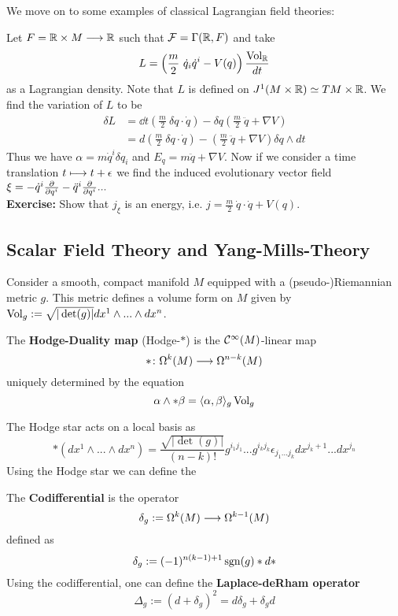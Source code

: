 We move on to some examples of classical Lagrangian field theories:

\begin{example}
  Let $F= \mathbb{R} \times M \longrightarrow \mathbb{R}$ such that ${\mathcal{F}} = \Gamma(\mathbb{R}, F)$ and take
  $$L = \left(\frac{m}{2} \ \dot q_i \dot q^i - V(q) \right)\frac{\operatorname{Vol}_{\mathbb{R}}}{dt}$$
  as a Lagrangian density. Note that $L$ is defined on $J^1(M \times \mathbb{R}) \simeq TM \times \mathbb{R}$. We find the variation of $L$ to be
  \begin{align*}
    \delta L &= \dd{}{t} \left( \frac{m}{2} \ \delta q \cdot \dot q \right) - \delta q \left( \frac{m}{2} \ \ddot q + \nabla V \right)\\
    &= d \left( \frac{m}{2} \ \delta q \cdot \dot q \right) - \left( \frac{m}{2} \ \ddot q + \nabla V \right) \delta q \wedge dt
  \end{align*}
  Thus we have $\alpha = m \dot q^i \delta q_i$ and $E_q = m \ddot q + \nabla V$. Now if we consider a time translation $t \lmap t + \epsilon$ we find the induced evolutionary vector field $\xi = - \dot q^i \frac{\partial }{\partial q^i} - \ddot q^i \frac{\partial }{\partial q^i} ...$\\
  \textbf{Exercise:} Show that $j_\xi$ is an energy, i.e. $j = \frac{m}{2} \ \dot q \cdot \dot q + V(q)$.
\end{example}

\newpage
\subsection{Scalar Field Theory and Yang-Mills-Theory}

Consider a smooth, compact manifold $M$ equipped with a (pseudo-)Riemannian metric $g$. This metric defines a volume form on $M$ given by $\operatorname{Vol}_g := \sqrt{|\det(g)|} dx^1 \wedge ... \wedge dx^n$.

\begin{definition}
  The \textbf{Hodge-Duality map} (Hodge-$*$) is the $\mathcal{C}^{\infty}(M)$-linear map
  $$ * \colon \Omega^k(M) \longrightarrow \Omega^{n-k}(M) $$
  uniquely determined by the equation
  $$ \alpha \wedge * \beta = \langle \alpha, \beta \rangle_g \operatorname{Vol}_g $$
\end{definition}

The Hodge star acts on a local basis as
$$ *(dx^1\wedge ... \wedge dx^n) = \frac{\sqrt{|\det(g)|}}{(n-k)!} g^{i_1 j_1} ... g^{i_k j_k} \epsilon_{j_1 ... j_k} dx^{j_k+1} ... dx^{j_n} $$
Using the Hodge star we can define the

\begin{definition}[Codifferential]
\label{def:codifferential}
  The \textbf{Codifferential} is the operator
  $$ \delta_g := \Omega^k(M) \longrightarrow \Omega^{k-1}(M) $$
  defined as
  $$ \delta_g := (-1)^{n(k-1)+1} \operatorname{sgn}(g) * d * $$
  Using the codifferential, one can define the \textbf{Laplace-deRham operator}
  $$ \Delta_g := (d+\delta_g)^2 = d \delta_g + \delta_g d $$
\end{definition}

